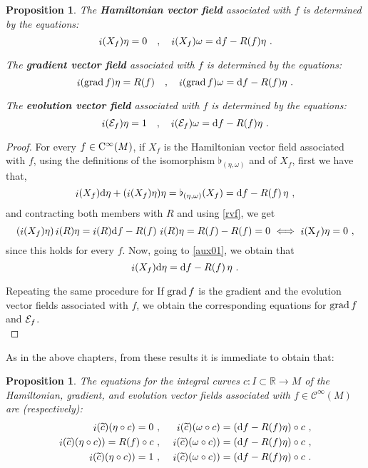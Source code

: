 \documentclass[12pt]{report}
\newtheorem{prop}[teor]{Proposition}
\def\beq{\begin{equation}}
\def\eeq{\end{equation}}
\def\bea{\begin{eqnarray}}
\def\eea{\end{eqnarray}}
\def\qed{\ifvmode\removelastskip\fi
{\unskip\nobreak\hfil\penalty50\hbox{}\nobreak\hfil
\hbox{\vrule height1.2ex width1.2ex}\parfillskip=0pt
\finalhyphendemerits=0 \par\smallskip}}
\def\d{{\rm d}}
\def\Real{\mathbb{R}}
\def\X{{\rm X}}
\def\inn{\mathop{i}\nolimits}
\def\Cinfty{{\rm C}^\infty}
\begin{document}
\begin{prop}
The \textbf{Hamiltonian vector field} associated with $f$
is determined by the equations:
\beq
\inn(X_f)\eta=0 \quad ,\quad \inn(X_f)\omega=\d f-R(f)\eta\ .
\label{Havf}
\eeq

The \textbf{gradient vector field} associated with $f$ is determined by the equations:
\beq
 \inn({{\rm grad}\, f})\eta = R(f) \quad ,\quad 
\inn({{\rm grad}\, f})\omega=\d f-R(f)\eta\ .
\label{gravf}
\eeq

The \textbf{evolution vector field}  associated with $f$
is determined by the equations:
\beq
\inn({\cal E}_f)\eta=1 \quad,\quad 
\inn({\cal E}_f)\omega = \d f- R(f)\eta\ .
\label{evovf}
\eeq
\end{prop}
\begin{proof}
For every $f\in\Cinfty(M)$,
if  $X_f$ is the Hamiltonian vector field associated with $f$,
using the definitions of the isomorphism $\flat_{(\eta,\omega)}$ and of $X_f$, first we have that,
\beq
\label{aux01}
\inn(X_f)\d\eta+(\inn(X_f)\eta)\eta=
\flat_{(\eta,\omega)}(X_f)=\d f-R(f)\,\eta \ ,
\eeq
and contracting both members with $R$ and using \eqref{rvf}, we get
$$
(\inn(X_f)\eta)\inn(R)\eta=
\inn(R)\d f-R(f)\,\inn(R)\eta=
R(f)-R(f)=0
\ \Longleftrightarrow\ \inn(\X_f)\eta=0 \ ,
$$
since this holds for every $f$.
Now, going to \eqref{aux01}, we obtain that
$$
\inn(X_f)\d\eta=\d f-R(f)\,\eta \ .
$$

Repeating the same procedure for 
If ${\rm grad}\,f$ is the gradient and the evolution vector fields associated with $f$,
we obtain the corresponding equations for 
${\rm grad}\,f$ and ${\cal E}_f$.
\\ \qed \end{proof}

As in the above chapters, from these results it is immediate to obtain that:

\begin{prop}
The equations for the integral curves $c\colon I\subset\Real\to M$
of the Hamiltonian, gradient, and evolution vector fields associated with
$f\in\mathcal{C}^\infty(M)$ are (respectively):
\bea
\inn(\widetilde{c})(\eta\circ c)=0 \ & ,& \ 
\inn(\widetilde{c})(\omega\circ c)=(\d f-R(f)\eta)\circ c\ , \nonumber \\
 \inn(\widetilde{c})(\eta\circ c)) = R(f)\circ c \ & , &\
\inn(\widetilde{c})(\omega\circ c))=(\d f-R(f)\eta)\circ c\ , \nonumber \\
\inn(\widetilde{c})(\eta\circ c))=1 \ & ,& \
\inn(\widetilde{c})(\omega\circ c)) = (\d f- R(f)\eta)\circ c\ .
\label{evoic}
\eea
\end{prop}
\end{document}

